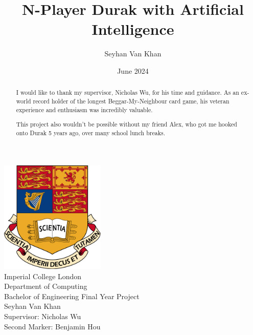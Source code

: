 \documentclass[a4paper, twoside, 12pt]{report}
\title{N-Player Durak with Artificial Intelligence}
\author{Seyhan Van Khan}
\date{June 2024}
\begin{document}
\begin{titlepage}
	\centering
	{\Huge \@title}
	\vspace{1cm}

	\includegraphics[width=5cm]{./imperial.png}
	\vspace{1cm} \\
	{\large  Imperial College London} \\
	\vspace{.4cm}
	{\large  Department of Computing} \\
	\vspace{.4cm}
	{\large  Bachelor of Engineering Final Year Project} \\
	\vspace{1cm}
	{\Huge  Seyhan Van Khan} \\
	\vspace{4cm}
	{\Large  Supervisor: Nicholas Wu} \\
	\vspace{0.5cm}
	{\Large  Second Marker: Benjamin Hou} \\
	\vspace{1cm}
	{\Large \@date}
\end{titlepage}

\renewcommand{\abstractname}{Acknowledgements}
\begin{abstract}

	I would like to thank my supervisor, Nicholas Wu, for his time and guidance. As an ex-world record holder of the longest Beggar-My-Neighbour card game, his veteran experience and enthusiasm was incredibly valuable.

	This project also wouldn't be possible without my friend Alex, who got me hooked onto Durak 5 years ago, over many school lunch breaks.

\end{abstract}
\end{document}
